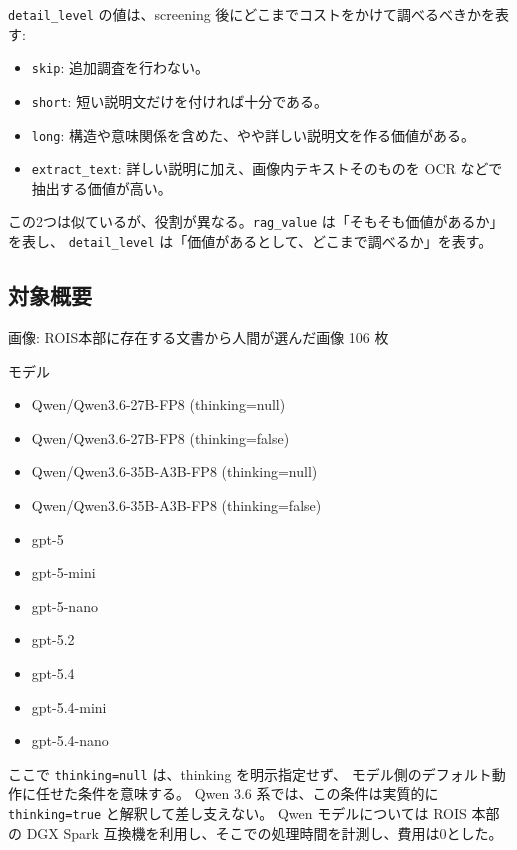 \documentclass[
]{article}
\providecommand{\tightlist}{%
  \setlength{\itemsep}{0pt}\setlength{\parskip}{0pt}}
\begin{document}
\texttt{detail\_level} の値は、screening
後にどこまでコストをかけて調べるべきかを表す:

\begin{itemize}
\tightlist
\item
  \texttt{skip}: 追加調査を行わない。
\item
  \texttt{short}: 短い説明文だけを付ければ十分である。
\item
  \texttt{long}:
  構造や意味関係を含めた、やや詳しい説明文を作る価値がある。
\item
  \texttt{extract\_text}: 詳しい説明に加え、画像内テキストそのものを OCR
  などで抽出する価値が高い。
\end{itemize}

この2つは似ているが、役割が異なる。\texttt{rag\_value}
は「そもそも価値があるか」を表し、 \texttt{detail\_level}
は「価値があるとして、どこまで調べるか」を表す。

\subsection{対象概要}\label{ux5bfeux8c61ux6982ux8981}

画像: ROIS本部に存在する文書から人間が選んだ画像 106 枚

モデル

\begin{itemize}
\tightlist
\item
  Qwen/Qwen3.6-27B-FP8 (thinking=null)
\item
  Qwen/Qwen3.6-27B-FP8 (thinking=false)
\item
  Qwen/Qwen3.6-35B-A3B-FP8 (thinking=null)
\item
  Qwen/Qwen3.6-35B-A3B-FP8 (thinking=false)
\item
  gpt-5
\item
  gpt-5-mini
\item
  gpt-5-nano
\item
  gpt-5.2
\item
  gpt-5.4
\item
  gpt-5.4-mini
\item
  gpt-5.4-nano
\end{itemize}

ここで \texttt{thinking=null} は、thinking を明示指定せず、
モデル側のデフォルト動作に任せた条件を意味する。 Qwen 3.6
系では、この条件は実質的に \texttt{thinking=true}
と解釈して差し支えない。 Qwen モデルについては ROIS 本部の DGX Spark
互換機を利用し、そこでの処理時間を計測し、費用は0とした。
\end{document}
